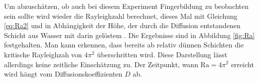 Um abzuschätzen, ob auch bei diesem Experiment Fingerbildung zu beobachten sein sollte wird wieder die Rayleighzahl berechnet, dieses Mal mit Gleichung \ref{eq:Ra2} und in Abhängigkeit der Höhe, der durch die Diffusion entstandenen Schicht aus Wasser mit darin gelöstem \COT. Die Ergebnisse sind in Abbildung \ref{fig:Ra} festgehalten. Man kann erkennen, dass bereits ab relativ dünnen Schichten die kritische Rayleighzah von $4\pi^2$ überschritten wird. Diese Darstellung lässt allerdings keine zeitliche Einschätzung zu. Der Zeitpunkt, wann $\mathrm{Ra} = 4\pi^2$ erreicht wird hängt vom Diffusionskoeffizienten $D$ ab.
